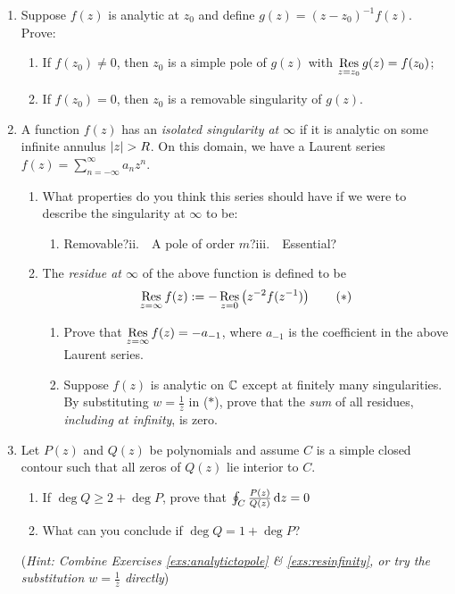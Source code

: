 \begin{exercises}
\begin{enumerate}
		
		\item\label{exs:analytictopole} Suppose $f(z)$ is analytic at $z_0$ and define $g(z)=(z-z_0)^{-1}f(z)$. Prove:
		\begin{enumerate}
		  \item If $f(z_0)\neq 0$, then $z_0$ is a simple pole of $g(z)$ with $\operatorname*{Res}\limits_{z=z_0}g(z)=f(z_0)$;
		  
		  \item If $f(z_0)= 0$, then $z_0$ is a removable singularity of $g(z)$.
		\end{enumerate}
		
		
		\item\label{exs:resinfinity} A function $f(z)$ has an \emph{isolated singularity at $\infty$} if it is analytic on some infinite annulus $\nm{z}>R$. On this domain, we have a Laurent series $f(z)=\sum_{n=-\infty}^\infty a_nz^n$.
		\begin{enumerate}
		  \item What properties do you think this series should have if we were to describe the singularity at $\infty$ to be:
		  \begin{enumerate}
		    \item Removable?\qquad ii.\ \ A pole of order $m$?\qquad iii.\ \ Essential?
		  \end{enumerate}
	
		  \item The \emph{residue at $\infty$} of the above function is defined to be
		\[
			\operatorname*{Res}_{z=\infty}f(z):=-\operatorname*{Res}_{z=0}\left(z^{-2}f(z^{-1})\right) \tag{$\ast$}
		\]
		 	\begin{enumerate}
		    \item Prove that $\operatorname*{Res}\limits_{z=\infty}f(z)=-a_{-1}$, where $a_{-1}$ is the coefficient in the above Laurent series.%
	
		    \item Suppose $f(z)$ is analytic on $\mathbb{C}$ except at finitely many singularities. By substituting $w=\frac 1z$ in ($\ast$), prove that the \emph{sum} of all residues, \emph{including at infinity}, is zero.
		  \end{enumerate}
		\end{enumerate}
	
		
		\item Let $P(z)$ and $Q(z)$ be polynomials and assume $C$ is a simple closed contour such that all zeros of $Q(z)$ lie interior to $C$.
		\begin{enumerate}
		  \item If $\deg Q\ge 2+\deg P$, prove that $\oint_C\frac{P(z)}{Q(z)}\,{\mathrm{d} z}=0$
			
			\item What can you conclude if $\deg Q=1+\deg P$?
		\end{enumerate}
		(\emph{Hint: Combine Exercises \ref*{exs:analytictopole} \& \ref*{exs:resinfinity}, or try the substitution $w=\frac 1z$ directly})

	\end{enumerate}
\end{exercises}


